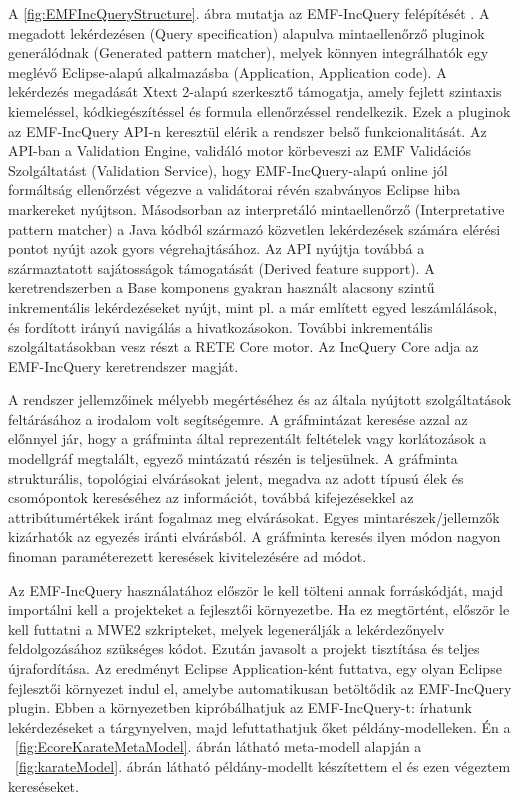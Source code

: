 A \ref{fig:EMFIncQueryStructure}. ábra mutatja az EMF-IncQuery felépítését \cite{Bergmann-TOOLS-2012}.
A megadott lekérdezésen (Query specification) alapulva mintaellenőrző pluginok generálódnak (Generated pattern matcher), melyek könnyen integrálhatók egy meglévő Eclipse-alapú alkalmazásba (Application, Application code).
A lekérdezés megadását Xtext 2-alapú szerkesztő támogatja, amely fejlett szintaxis kiemeléssel, kódkiegészítéssel és formula ellenőrzéssel rendelkezik.
Ezek a pluginok az EMF-IncQuery API-n keresztül elérik a rendszer belső funkcionalitását.
Az API-ban a Validation Engine, validáló motor körbeveszi az EMF Validációs Szolgáltatást  (Validation Service), hogy EMF-IncQuery-alapú online jól formáltság ellenőrzést végezve a validátorai révén szabványos Eclipse hiba markereket nyújtson.
Másodsorban az interpretáló mintaellenőrző (Interpretative pattern matcher) a Java kódból származó közvetlen lekérdezések számára elérési pontot nyújt azok gyors végrehajtásához.
Az API nyújtja továbbá a származtatott sajátosságok támogatását (Derived feature support).
A keretrendszerben a Base komponens gyakran használt alacsony szintű inkrementális lekérdezéseket nyújt, mint pl. a már említett egyed leszámlálások, és fordított irányú navigálás a hivatkozásokon.
További inkrementális szolgáltatásokban vesz részt a RETE Core motor.
Az IncQuery Core adja az EMF-IncQuery keretrendszer magját.

A rendszer jellemzőinek mélyebb megértéséhez és az általa nyújtott szolgáltatások feltárásához a \cite{Bergmann-TOOLS-2012} irodalom volt segítségemre.
A gráfmintázat keresése azzal az előnnyel jár, hogy a gráfminta által reprezentált feltételek vagy korlátozások a modellgráf megtalált, egyező mintázatú részén is teljesülnek.
A gráfminta strukturális, topológiai elvárásokat jelent, megadva az adott típusú élek és csomópontok kereséséhez az információt, továbbá kifejezésekkel az attribútumértékek iránt fogalmaz meg elvárásokat.
Egyes mintarészek/jellemzők kizárhatók az egyezés iránti elvárásból.
A gráfminta keresés ilyen módon nagyon finoman paraméterezett keresések kivitelezésére ad módot.

Az EMF-IncQuery használatához először le kell tölteni annak forráskódját, majd importálni kell a projekteket a fejlesztői környezetbe.
Ha ez megtörtént, először le kell futtatni a MWE2 szkripteket, melyek legenerálják a lekérdezőnyelv feldolgozásához szükséges kódot.
Ezután javasolt a projekt tisztítása és teljes újrafordítása.
Az eredményt Eclipse Application-ként futtatva, egy olyan Eclipse fejlesztői környezet indul el, amelybe automatikusan betöltődik az EMF-IncQuery plugin.
Ebben a környezetben kipróbálhatjuk az EMF-IncQuery-t: írhatunk lekérdezéseket a
tárgynyelven, majd lefuttathatjuk őket példány-modelleken.
Én a ~\ref{fig:EcoreKarateMetaModel}. ábrán látható meta-modell alapján a ~\ref{fig:karateModel}. ábrán látható példány-modellt készítettem el és ezen végeztem kereséseket.

